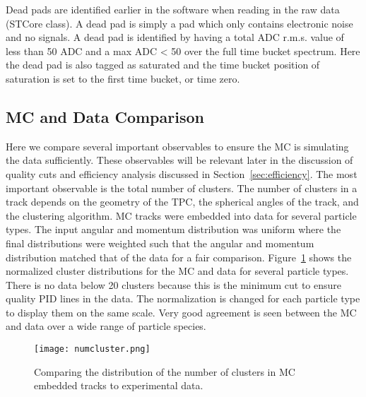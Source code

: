 Dead pads are identified earlier in the software when reading in the raw data (STCore class). A dead pad is simply a pad which only contains electronic noise and no signals. A dead pad is identified by having a total ADC r.m.s. value  of less than 50 ADC and a max ADC < 50 over the full time bucket spectrum. Here the dead pad is also tagged as saturated and the time bucket position of saturation is set to the first time bucket, or time zero. 



\subsection{MC and Data Comparison}

Here we compare several important observables to ensure the MC is simulating the data sufficiently. These observables will be relevant later in the discussion of quality cuts and efficiency analysis discussed in Section~\ref{sec:efficiency}. The most important observable is the total number of clusters. The number of clusters in a track depends on the geometry of the TPC, the spherical angles of the track, and the clustering algorithm. MC tracks were embedded into data for several particle types. The input angular and momentum distribution was uniform where the final distributions were weighted such that the angular and momentum distribution matched that of the data for a fair comparison. Figure~\ref{fig:clustcomp} shows the normalized cluster distributions for the MC and data for several particle types. There is no data below 20 clusters because this is the minimum cut to ensure quality PID lines in the data. The normalization is changed for each particle type to display them on the same scale. Very good agreement is seen between the MC and data over a wide range of particle species. 

\begin{figure}[!hbt]
\texttt{[image: numcluster.png]}
\caption{Comparing the distribution of the number of clusters in MC embedded tracks to experimental data.}
\label{fig:clustcomp}
\end{figure}

